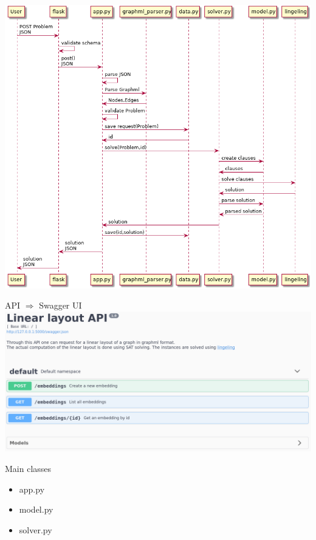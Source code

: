 \documentclass[11pt]{beamer}
\begin{document}
    \begin{frame}
        \includegraphics[height=\textheight]{flow.png}
    \end{frame}

    \begin{frame}{API $\Rightarrow$ Swagger UI}
        \includegraphics[width=\linewidth]{swagger-UI.png}
    \end{frame}

    \begin{frame}{Main classes}
        \begin{itemize}
            \item app.py
            \item model.py
            \item solver.py
        \end{itemize}
    \end{frame}
\end{document}
